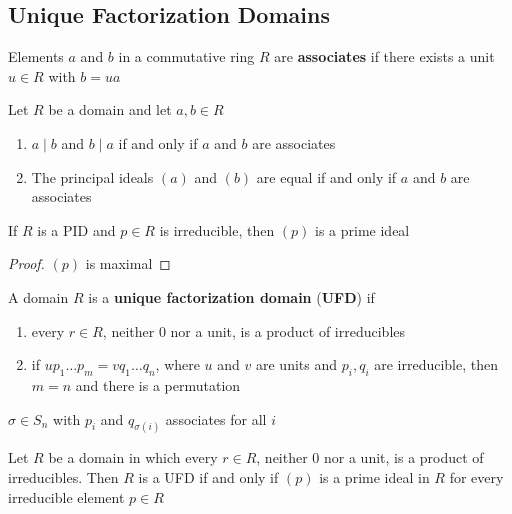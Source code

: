 \documentclass[11pt]{article}
\begin{document}
\subsection{Unique Factorization Domains}
\label{sec:orgbc2a23b}
\begin{definition}[]
Elements \(a\) and \(b\) in a commutative ring \(R\) are \textbf{associates} if there exists
a unit \(u\in R\) with \(b=ua\)
\end{definition}

\begin{proposition}[]
Let \(R\) be a domain and let \(a,b\in R\)
\begin{enumerate}
\item \(a\mid b\) and \(b\mid a\) if and only if \(a\) and \(b\) are associates
\item The principal ideals \((a)\)  and \((b)\) are equal if and only if \(a\)
and \(b\) are associates
\end{enumerate}
\end{proposition}

\begin{corollary}[]
If \(R\) is a PID and \(p\in R\) is irreducible, then \((p)\) is a prime ideal
\end{corollary}

\begin{proof}
\((p)\) is maximal
\end{proof}

\begin{definition}[]
A domain \(R\) is a \textbf{unique factorization domain} (\textbf{UFD}) if
\begin{enumerate}
\item every \(r\in R\), neither 0 nor a unit, is a product of irreducibles
\item if \(up_1\dots p_m=vq_1\dots q_n\), where \(u\) and \(v\) are units and
\(p_i,q_i\) are irreducible, then \(m=n\) and there is a permutation
\end{enumerate}
\(\sigma\in S_n\) with \(p_i\) and \(q_{\sigma(i)}\) associates for all \(i\)
\end{definition}

\begin{proposition}[]
\label{prop6.17}
Let \(R\) be a domain in which every \(r\in R\), neither 0 nor a unit, is a
product of irreducibles. Then \(R\) is a UFD if and only if \((p)\) is a prime
ideal in \(R\) for every irreducible element \(p\in R\)
\end{proposition}
\end{document}

